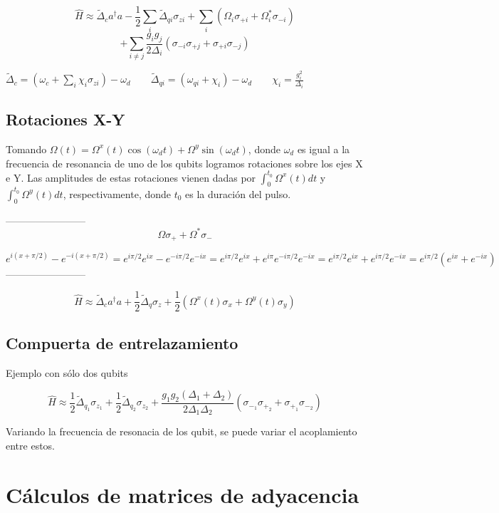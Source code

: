 \documentclass[11pt, spanish]{report}
\begin{document}
$$\hat{H} \approx \tilde{\Delta}_c a^\dagger a - \frac{1}{2} \sum\limits_i \tilde{\Delta}_{qi} \sigma_{zi} + \sum\limits_i (\Omega_i \sigma_{+i} + \Omega_i^* \sigma_{-i})$$
$$+ \sum\limits_{i \neq j} \frac{g_i g_j}{2 \Delta_i} (\sigma_{-i} \sigma_{+j}+\sigma_{+i} \sigma_{-j})$$

$\tilde{\Delta}_c = (\omega_c + \sum\limits_i \chi_i \sigma_{zi}) - \omega_d \qquad \tilde{\Delta}_{qi} = (\omega_{qi} + \chi_i) - \omega_d \qquad \chi_i = \frac{g_i^2}{\Delta_i}$

\section{Rotaciones X-Y}

Tomando $\Omega(t) = \Omega^x(t) \cos(\omega_d t) + \Omega^y \sin(\omega_d t)$, donde $\omega_d$ es igual a la frecuencia de resonancia de uno de los qubits logramos rotaciones sobre los ejes X e Y. Las amplitudes de estas rotaciones vienen dadas por $\int_0^{t_0} \Omega^x(t) dt$ y $\int_0^{t_0} \Omega^y(t) dt$, respectivamente, donde $t_0$ es la duración del pulso.

------------------------
$$ \Omega \sigma_+ + \Omega^* \sigma_- $$

$$ e^{i(x+\pi/2)}-e^{-i(x+\pi/2)} = e^{i\pi/2}e^{ix}-e^{-i\pi/2}e^{-ix} =
e^{i\pi/2}e^{ix}+e^{i\pi}e^{-i\pi/2}e^{-ix} = e^{i\pi/2}e^{ix}+e^{i\pi/2}e^{-ix} = e^{i\pi/2}(e^{ix}+e^{-ix})$$
------------------------

$$\hat{H} \approx \tilde{\Delta}_c a^\dagger a + \frac{1}{2} \tilde{\Delta}_q \sigma_z + \frac{1}{2} (\Omega^x(t) \sigma_x + \Omega^y(t) \sigma_y)$$

\section{Compuerta de entrelazamiento}

Ejemplo con sólo dos qubits

$$\hat{H} \approx \frac{1}{2} \tilde{\Delta}_{q_1} \sigma_{z_1} + \frac{1}{2} \tilde{\Delta}_{q_2} \sigma_{z_2} + \frac{g_1 g_2 (\Delta_1 + \Delta_2)}{2 \Delta_1 \Delta_2} (\sigma_{-_1} \sigma_{+_2} + \sigma_{+_1} \sigma_{-_2})$$

Variando la frecuencia de resonacia de los qubit, se puede variar el acoplamiento entre estos. 

\chapter{Cálculos de matrices de adyacencia}



\end{document}
